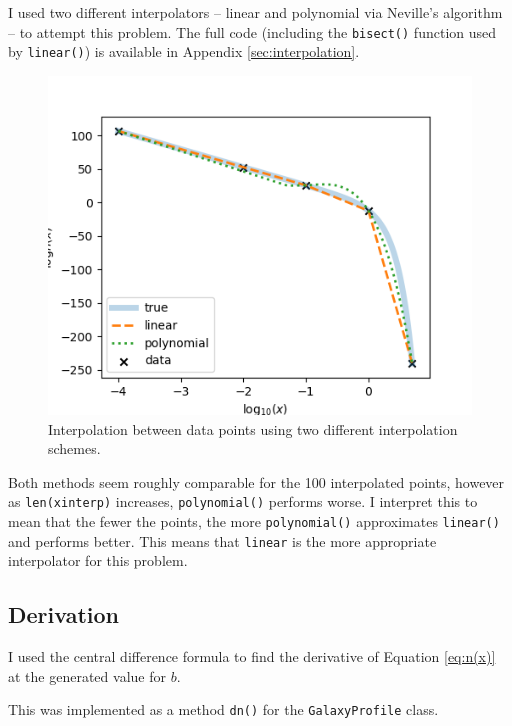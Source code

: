     I used two different interpolators -- linear and polynomial via Neville's algorithm -- to attempt this problem. The full code (including the \texttt{bisect()} function used by \texttt{linear()}) is available in Appendix \ref{sec:interpolation}.

    

    

    

    \begin{figure}[H]
        \centering
        \includegraphics[width=.5\textwidth]{output/2b_interpolation.png}
        \caption{Interpolation between data points using two different interpolation schemes.}
    \end{figure}

    Both methods seem roughly comparable for the 100 interpolated points, however as \texttt{len(xinterp)} increases, \texttt{polynomial()} performs worse. I interpret this to mean that the fewer the points, the more \texttt{polynomial()} approximates \texttt{linear()} and performs better. This means that \texttt{linear} is the more appropriate interpolator for this problem.



    \newpage
    \subsection{Derivation}

    I used the central difference formula to find the derivative of Equation \ref{eq:n(x)} at the generated value for $b$. 

    This was implemented as a method \texttt{dn()} for the \texttt{GalaxyProfile} class.

